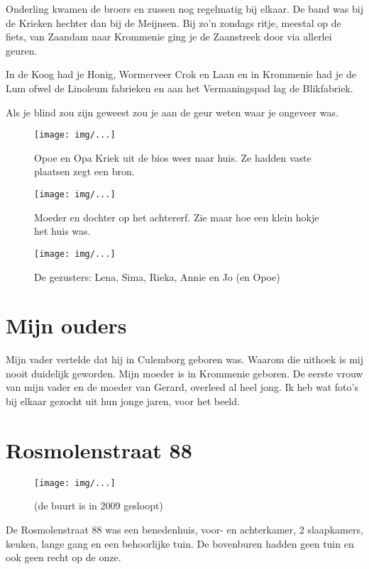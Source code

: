 \documentclass[10pt,twoside,openright]{memoir}
\begin{document}
Onderling kwamen de broers en zussen nog regelmatig bij elkaar. De band was bij de Krieken hechter dan bij de Meijnsen. Bij zo’n zondags ritje, meestal op de fiets, van Zaandam naar Krommenie ging je de Zaanstreek door via allerlei geuren. 

In de Koog had je Honig, Wormerveer Crok en Laan en in Krommenie had je de Lum ofwel de Linoleum fabrieken en aan het Vermaningspad lag de Blikfabriek. 

Als je blind zou zijn geweest zou je aan de geur weten waar je ongeveer was. 

\begin{figure}[t]
\texttt{[image: img/...]}
\caption{Opoe en Opa Kriek uit de bios weer naar huis. Ze hadden vaste plaatsen zegt een bron.}
\end{figure}

\begin{figure}[t]
\texttt{[image: img/...]}
\caption{Moeder en dochter op het achtererf. Zie maar hoe een klein hokje het huis was.}
\end{figure}

\begin{figure}[t]
\texttt{[image: img/...]}
\caption{De gezusters: Lena, Sima, Rieka, Annie en Jo (en Opoe)}
\end{figure}

\chapter{Mijn ouders} %
\label{cha:ouders}

Mijn vader vertelde dat hij in Culemborg geboren was. Waarom die uithoek is mij nooit duidelijk geworden. Mijn moeder is in Krommenie geboren. De eerste vrouw van mijn vader en de moeder van Gerard, overleed al heel jong. Ik heb wat foto's bij elkaar gezocht uit hun jonge jaren, voor het beeld.

\chapter{Rosmolenstraat 88} %
\label{cha:rosmolenstraat}

\begin{figure}[t]
\texttt{[image: img/...]}
\caption{(de buurt is in 2009 gesloopt)}
\end{figure}

De Rosmolenstraat 88 was een benedenhuis, voor- en achterkamer, 2 slaapkamers, keuken, lange gang en een behoorlijke tuin. De bovenburen hadden geen tuin en ook geen recht op de onze. 
\end{document}
